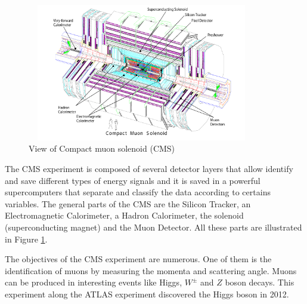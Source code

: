 \begin{figure}[ht]
	\centering
	\includegraphics[width=10cm,height=6cm]{Chapter2/cms2.png}
	\caption[View of Compact muon solenoid (CMS)]{View of Compact muon solenoid (CMS)\cite{cms-manual}}\label{cms}
\end{figure}
The CMS experiment is composed of several detector layers that allow identify and save different types of energy signals and it is saved in a powerful supercomputers that separate and classify the data according to certains variables. The general parts of the CMS are the Silicon Tracker, an Electromagnetic Calorimeter, a Hadron Calorimeter, the solenoid (superconducting magnet) and the Muon Detector. All these parts are illustrated in Figure \ref{cms}.

 The objectives of the CMS experiment are numerous. One of them is the identification of muons by measuring the momenta and scattering angle. Muons can be produced in interesting events like Higgs, $W^{\pm}$ and $Z$ boson decays. %
This experiment along the ATLAS experiment discovered the Higgs boson in 2012.


